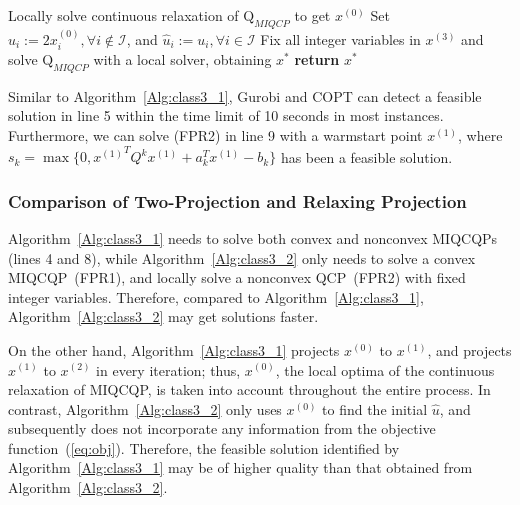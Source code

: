 \documentclass[]{article}
\begin{document}
\begin{algorithm}[!htbp]
\SetAlgoLined
\LinesNumbered
{}
 Locally solve continuous relaxation of $\mathrm{Q}_{MIQCP}$ to get $x^{(0)}$\;
 Set $\hat{u}_i:= 2x^{(0)}_i, \forall i\notin \mathcal{I}$, and $\hat{u}_i:= u_i, \forall i\in \mathcal{I}$\;
 Fix all integer variables in $x^{(3)}$ and solve $\mathrm{Q}_{MIQCP}$ with a local solver, obtaining $x^*$\;
 \textbf{return} $x^*$
 \caption{Relaxing Projection Method}
 \label{Alg:class3_2}
\end{algorithm}

Similar to Algorithm~\ref{Alg:class3_1}, Gurobi \cite{gurobi} and COPT \cite{copt} can detect a feasible solution in line 5 within the time limit of 10 seconds in most instances. Furthermore, we can solve (FPR2) in line 9 with a warmstart point $x^{(1)}$, where $s_k = \max\{0, {x^{(1)}}^TQ^kx^{(1)} + a_k^Tx^{(1)} - b_k\}$ has been a feasible solution.


\subsubsection{Comparison of Two-Projection and Relaxing Projection}
Algorithm~\ref{Alg:class3_1} needs to solve both convex and nonconvex MIQCQPs (lines 4 and 8), while Algorithm~\ref{Alg:class3_2} only needs to solve a convex MIQCQP~(FPR1), and locally solve a nonconvex QCP~(FPR2) with fixed integer variables. Therefore, compared to Algorithm~\ref{Alg:class3_1}, Algorithm~\ref{Alg:class3_2} may get solutions faster. 

On the other hand, Algorithm~\ref{Alg:class3_1} projects $x^{(0)}$ to $x^{(1)}$, and projects $x^{(1)}$ to $x^{(2)}$ in every iteration; thus, $x^{(0)}$, the local optima of the continuous relaxation of MIQCQP, is taken into account throughout the entire process. In contrast, Algorithm~\ref{Alg:class3_2} only uses $x^{(0)}$ to find the initial $\hat{u}$, and subsequently does not incorporate any information from the objective function~(\ref{eq:obj}). Therefore, the feasible solution identified by Algorithm~\ref{Alg:class3_1} may be of higher quality than that obtained from Algorithm~\ref{Alg:class3_2}.
\end{document}
